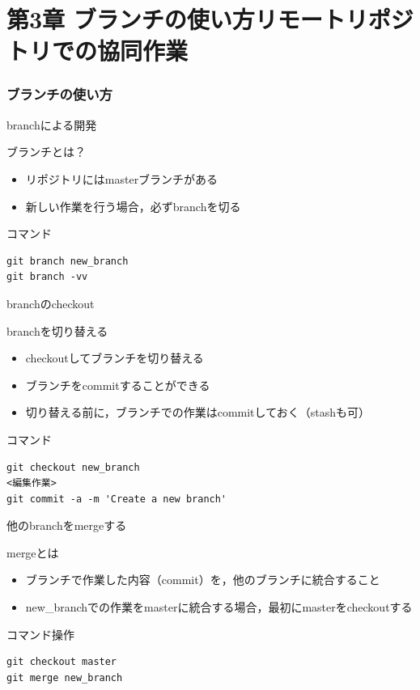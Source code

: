 \documentclass[t, aspectratio=169]{beamer}
\begin{document}
\part{第3章 ブランチの使い方リモートリポジトリでの協同作業}
\label{sec-3}
\section{ブランチの使い方}
\label{sec-3-1}
\begin{frame}[fragile,label=sec-3-1-1]{branchによる開発}
 \begin{block}{ブランチとは？}
\begin{itemize}
\item リポジトリにはmasterブランチがある
\item 新しい作業を行う場合，必ずbranchを切る
\end{itemize}
\end{block}
\begin{block}{コマンド}
\begin{verbatim}
git branch new_branch
git branch -vv
\end{verbatim}
\end{block}
\end{frame}

\begin{frame}[fragile,label=sec-3-1-2]{branchのcheckout}
 \begin{block}{branchを切り替える}
\begin{itemize}
\item checkoutしてブランチを切り替える
\item ブランチをcommitすることができる
\item 切り替える前に，ブランチでの作業はcommitしておく（stashも可）
\end{itemize}
\end{block}
\begin{block}{コマンド}
\begin{verbatim}
git checkout new_branch
<編集作業>
git commit -a -m 'Create a new branch'
\end{verbatim}
\end{block}
\end{frame}

\begin{frame}[fragile,label=sec-3-1-3]{他のbranchをmergeする}
 \begin{block}{mergeとは}
\begin{itemize}
\item ブランチで作業した内容（commit）を，他のブランチに統合すること
\item new\_branchでの作業をmasterに統合する場合，最初にmasterをcheckoutする
\end{itemize}
\end{block}
\begin{block}{コマンド操作}
\begin{verbatim}
git checkout master
git merge new_branch
\end{verbatim}
\end{block}
\end{frame}
\end{document}
